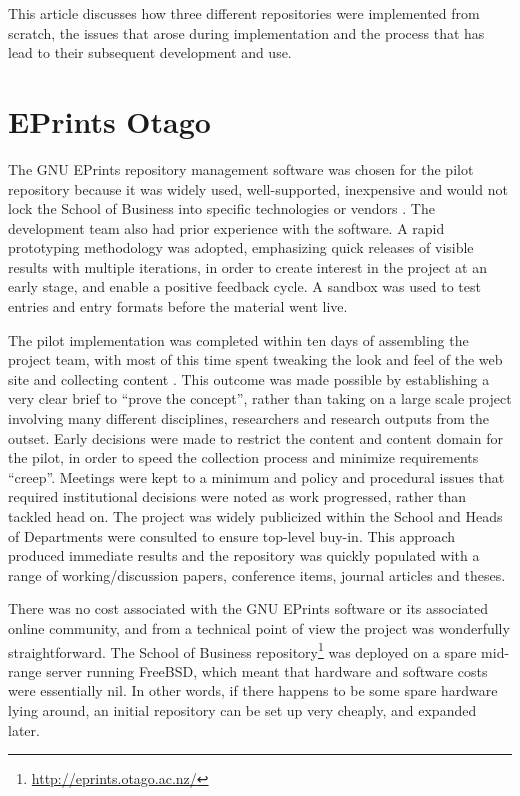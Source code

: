 \documentclass[12pt,pdftex,a4paper,titlepage]{article}
\begin{document}
This article discusses how three different repositories were implemented from scratch, the issues that arose during implementation and the process that has lead to their subsequent development and use.


\section{EPrints Otago}

The GNU EPrints repository management software was chosen for the pilot repository because it was widely used, well-supported, inexpensive and would not lock the School of Business into specific technologies or vendors  \cite{Sale-A-2005-NZIRW}. The development team also had prior experience with the software. A rapid prototyping methodology was adopted, emphasizing quick releases of visible results with multiple iterations, in order to create interest in the project at an early stage, and enable a positive feedback cycle. A sandbox was used to test entries and entry formats before the material went live.

The pilot implementation was completed within ten days of assembling the project team, with most of this time spent tweaking the look and feel of the web site and collecting content \cite{Stan-N-2006-running}. This outcome was made possible by establishing a very clear brief to ``prove the concept'', rather than taking on a large scale project involving many different disciplines, researchers and research outputs from the outset. Early decisions were made to restrict the content and content domain for the pilot, in order to speed the collection process and minimize requirements ``creep''. Meetings were kept to a minimum and policy and procedural issues that required institutional decisions were noted as work progressed, rather than tackled head on. The project was widely publicized within the School and Heads of Departments were consulted to ensure top-level buy-in. This approach produced immediate results and the repository was quickly populated with a range of working/discussion papers, conference items, journal articles and theses.

There was no cost associated with the GNU EPrints software or its associated online community, and from a technical point of view the project was wonderfully straightforward. The School of Business repository\footnote{\url{http://eprints.otago.ac.nz/}} was deployed on a spare mid-range server running FreeBSD, which meant that hardware and software costs were essentially nil. In other words, if there happens to be some spare hardware lying around, an initial repository can be set up very cheaply, and expanded later.
\end{document}
